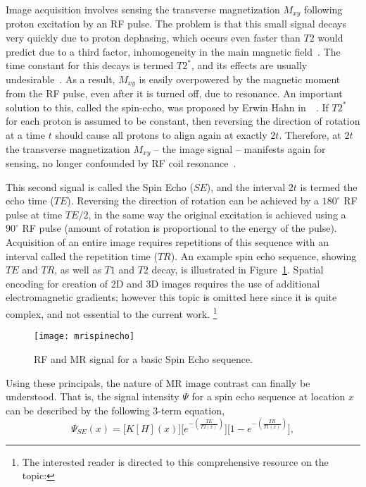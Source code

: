 Image acquisition involves sensing the transverse magnetization $M_{xy}$
following proton excitation by an RF pulse.
The problem is that this small signal decays very quickly due to proton dephasing,
which occurs even faster than $T2$ would predict due to a third factor,
inhomogeneity in the main magnetic field~\cite{Chavhan2009}.
The time constant for this decays is termed $T2^*$,
and its effects are usually undesirable~\cite{Chavhan2009}.
As a result, $M_{xy}$ is easily overpowered by the magnetic moment from the RF pulse,
even after it is turned off, due to resonance.
An important solution to this, called the spin-echo,
was proposed by Erwin Hahn in~\citeyear{Hahn1950}~\cite{Hahn1950}.
If $T2^*$ for each proton is assumed to be constant, then reversing the direction of rotation
at a time $t$ should cause all protons to align again at exactly $2t$.
Therefore, at $2t$ the transverse magnetization $M_{xy}$ -- the image signal -- 
manifests again for sensing, no longer confounded by RF coil resonance~\cite{Hahn1950}.
\par
This second signal is called the Spin Echo ($SE$),
and the interval $2t$ is termed the echo time ($TE$).
Reversing the direction of rotation can be achieved by a $180^{\circ}$ RF pulse
at time $TE/2$, in the same way the original excitation is achieved using a $90^{\circ}$
RF pulse (amount of rotation is proportional to the energy of the pulse).
Acquisition of an entire image requires repetitions of this sequence with an interval
called the repetition time ($TR$).
An example spin echo sequence, showing $TE$ and $TR$, as well as $T1$ and $T2$ decay,
is illustrated in Figure~\ref{fig:mrispinecho}.
Spatial encoding for creation of 2D and 3D images
requires the use of additional electromagnetic gradients; 
however this topic is omitted here since it is quite complex, and not essential to the current work.%
\footnote{The interested reader is directed to this comprehensive resource on the topic:
  }
\par
\begin{figure}
  \centering\texttt{[image: mrispinecho]}
  \caption{RF and MR signal for a basic Spin Echo sequence.}%
  \label{fig:mrispinecho}
\end{figure}
Using these principals, the nature of MR image contrast can finally be understood.
That is, the signal intensity $\Psi$ for a spin echo sequence at location $x$
can be described by the following 3-term equation,
\begin{equation}\label{eq:MRI-SE}
  \Psi_{SE}(x) = \bigg[K [H](x)\bigg]
    \bigg[e^{-\left(\frac{TE}{T2(x)}\right)}\bigg]
    \bigg[1 - e^{-\left(\frac{TR}{T1(x)}\right)}\bigg],
\end{equation}
